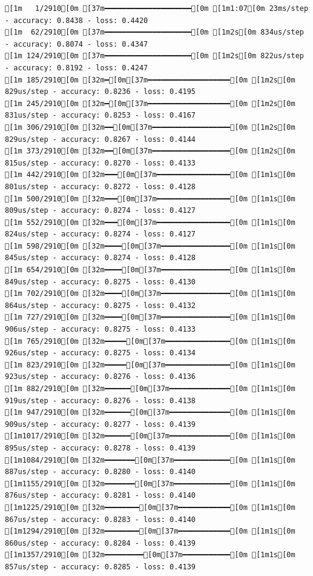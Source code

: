 \documentclass[
  letterpaper,
  DIV=11,
  numbers=noendperiod]{scrartcl}
\begin{document}
\begin{verbatim}
[1m   1/2910[0m [37m━━━━━━━━━━━━━━━━━━━━[0m [1m1:07[0m 23ms/step - accuracy: 0.8438 - loss: 0.4420
[1m  62/2910[0m [37m━━━━━━━━━━━━━━━━━━━━[0m [1m2s[0m 834us/step - accuracy: 0.8074 - loss: 0.4347 
[1m 124/2910[0m [37m━━━━━━━━━━━━━━━━━━━━[0m [1m2s[0m 822us/step - accuracy: 0.8192 - loss: 0.4247
[1m 185/2910[0m [32m━[0m[37m━━━━━━━━━━━━━━━━━━━[0m [1m2s[0m 829us/step - accuracy: 0.8236 - loss: 0.4195
[1m 245/2910[0m [32m━[0m[37m━━━━━━━━━━━━━━━━━━━[0m [1m2s[0m 831us/step - accuracy: 0.8253 - loss: 0.4167
[1m 306/2910[0m [32m━━[0m[37m━━━━━━━━━━━━━━━━━━[0m [1m2s[0m 829us/step - accuracy: 0.8267 - loss: 0.4144
[1m 373/2910[0m [32m━━[0m[37m━━━━━━━━━━━━━━━━━━[0m [1m2s[0m 815us/step - accuracy: 0.8270 - loss: 0.4133
[1m 442/2910[0m [32m━━━[0m[37m━━━━━━━━━━━━━━━━━[0m [1m1s[0m 801us/step - accuracy: 0.8272 - loss: 0.4128
[1m 500/2910[0m [32m━━━[0m[37m━━━━━━━━━━━━━━━━━[0m [1m1s[0m 809us/step - accuracy: 0.8274 - loss: 0.4127
[1m 552/2910[0m [32m━━━[0m[37m━━━━━━━━━━━━━━━━━[0m [1m1s[0m 824us/step - accuracy: 0.8274 - loss: 0.4127
[1m 598/2910[0m [32m━━━━[0m[37m━━━━━━━━━━━━━━━━[0m [1m1s[0m 845us/step - accuracy: 0.8274 - loss: 0.4128
[1m 654/2910[0m [32m━━━━[0m[37m━━━━━━━━━━━━━━━━[0m [1m1s[0m 849us/step - accuracy: 0.8275 - loss: 0.4130
[1m 702/2910[0m [32m━━━━[0m[37m━━━━━━━━━━━━━━━━[0m [1m1s[0m 864us/step - accuracy: 0.8275 - loss: 0.4132
[1m 727/2910[0m [32m━━━━[0m[37m━━━━━━━━━━━━━━━━[0m [1m1s[0m 906us/step - accuracy: 0.8275 - loss: 0.4133
[1m 765/2910[0m [32m━━━━━[0m[37m━━━━━━━━━━━━━━━[0m [1m1s[0m 926us/step - accuracy: 0.8275 - loss: 0.4134
[1m 823/2910[0m [32m━━━━━[0m[37m━━━━━━━━━━━━━━━[0m [1m1s[0m 923us/step - accuracy: 0.8276 - loss: 0.4136
[1m 882/2910[0m [32m━━━━━━[0m[37m━━━━━━━━━━━━━━[0m [1m1s[0m 919us/step - accuracy: 0.8276 - loss: 0.4138
[1m 947/2910[0m [32m━━━━━━[0m[37m━━━━━━━━━━━━━━[0m [1m1s[0m 909us/step - accuracy: 0.8277 - loss: 0.4139
[1m1017/2910[0m [32m━━━━━━[0m[37m━━━━━━━━━━━━━━[0m [1m1s[0m 895us/step - accuracy: 0.8278 - loss: 0.4139
[1m1084/2910[0m [32m━━━━━━━[0m[37m━━━━━━━━━━━━━[0m [1m1s[0m 887us/step - accuracy: 0.8280 - loss: 0.4140
[1m1155/2910[0m [32m━━━━━━━[0m[37m━━━━━━━━━━━━━[0m [1m1s[0m 876us/step - accuracy: 0.8281 - loss: 0.4140
[1m1225/2910[0m [32m━━━━━━━━[0m[37m━━━━━━━━━━━━[0m [1m1s[0m 867us/step - accuracy: 0.8283 - loss: 0.4140
[1m1294/2910[0m [32m━━━━━━━━[0m[37m━━━━━━━━━━━━[0m [1m1s[0m 860us/step - accuracy: 0.8284 - loss: 0.4139
[1m1357/2910[0m [32m━━━━━━━━━[0m[37m━━━━━━━━━━━[0m [1m1s[0m 857us/step - accuracy: 0.8285 - loss: 0.4139

\end{verbatim}
\end{document}
